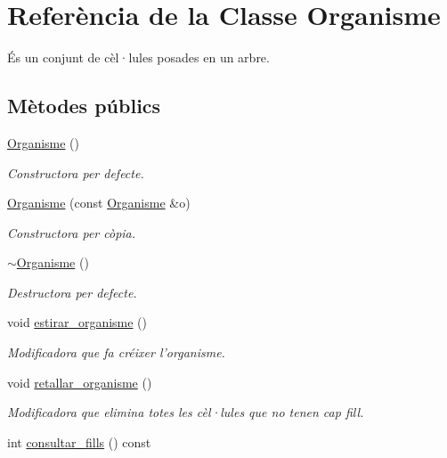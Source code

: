 \hypertarget{class_organisme}{\section{Referència de la Classe Organisme}
\label{class_organisme}
}


És un conjunt de cèl·lules posades en un arbre.  


\subsection*{Mètodes públics}
\begin{DoxyCompactItemize}
\item 
\hyperlink{class_organisme_a5624eb8adf14bc96d783067d51605fbd}{Organisme} ()
\begin{DoxyCompactList}\small\item\em Constructora per defecte. \end{DoxyCompactList}\item 
\hyperlink{class_organisme_a185bb1fe4199489f8c36b6ad53bdd562}{Organisme} (const \hyperlink{class_organisme}{Organisme} \&o)
\begin{DoxyCompactList}\small\item\em Constructora per còpia. \end{DoxyCompactList}\item 
\hyperlink{class_organisme_a55c9d7cbc9683970ad88455fdc3be7aa}{$\sim$\-Organisme} ()
\begin{DoxyCompactList}\small\item\em Destructora per defecte. \end{DoxyCompactList}\item 
void \hyperlink{class_organisme_a41a2ea17f4287dc3d00a45476a602309}{estirar\-\_\-organisme} ()
\begin{DoxyCompactList}\small\item\em Modificadora que fa créixer l'organisme. \end{DoxyCompactList}\item 
void \hyperlink{class_organisme_a3db36c1cb9d93f2750fd033b137dc702}{retallar\-\_\-organisme} ()
\begin{DoxyCompactList}\small\item\em Modificadora que elimina totes les cèl·lules que no tenen cap fill. \end{DoxyCompactList}\item 
int \hyperlink{class_organisme_a908bceb8c1aa3ec7e5eeb3c5c10f111b}{consultar\-\_\-fills} () const 

\end{DoxyCompactItemize}
